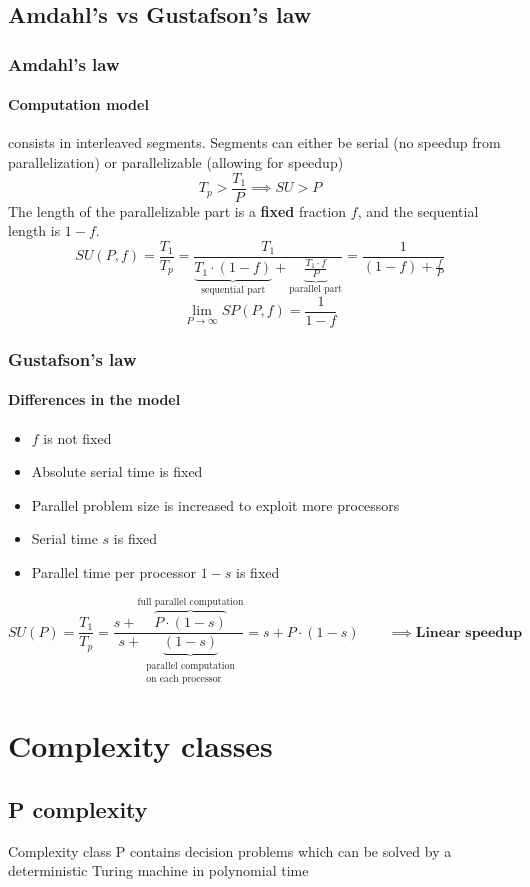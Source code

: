 \documentclass{article}
\begin{document}
\subsection{Amdahl's vs Gustafson's law}
\subsubsection{Amdahl's law}
\paragraph{Computation model} consists in interleaved segments. Segments can either be serial (no speedup from parallelization) or parallelizable (allowing for speedup)\\
\[T_p>\frac{T_1}{P} \implies SU>P\]
The length of the parallelizable part is a \textbf{fixed} fraction $f$, and the sequential length is $1-f$.
\[
SU(P,f)=\frac{T_1}{T_p}
=\frac{T_1}{\underbrace{T_1\cdot (1-f)}_\text{sequential part}+\underbrace{\frac{T_1\cdot f}{P}}_\text{parallel part}}
=\frac{1}{(1-f)+\frac{f}{P}}
\]
\[\lim_{P\to \infty} SP(P,f) = \frac{1}{1-f}\]

\subsubsection{Gustafson's law}
\paragraph{Differences in the model}
\begin{itemize}
\item $f$ is not fixed
\item Absolute serial time is fixed
\item Parallel problem size is increased to exploit more processors
\item Serial time $s$ is fixed
\item Parallel time per processor $1-s$ is fixed
\end{itemize}
\[SU(P)=\frac{T_1}{T_p}
=\frac{s+\overbrace{P\cdot (1-s)}^\text{full parallel computation}}{s+\underbrace{(1-s)}_{\substack{\text{parallel computation}\\ \text{on each processor}}}}
=s+P\cdot (1-s)
\qquad \implies \textbf{Linear speedup}
\]

\section{Complexity classes}
\subsection{P complexity}
Complexity class P contains decision problems which can be solved by a deterministic Turing machine in polynomial time
\end{document}
